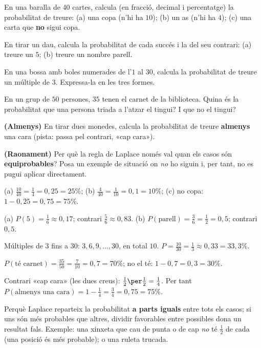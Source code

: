 \begin{exercicis}
\begin{exlist}
  \item En una baralla de $40$ cartes, calcula (en fracció, decimal i percentatge) la
        probabilitat de treure: (a) una copa (n'hi ha $10$); (b) un as (n'hi ha $4$);
        (c) una carta que \textbf{no} sigui copa.
  \item En tirar un dau, calcula la probabilitat de cada succés i la del seu contrari:
        (a) treure un $5$; (b) treure un nombre parell.
  \item En una bossa amb boles numerades de l'$1$ al $30$, calcula la probabilitat de
        treure un múltiple de $3$. Expressa-la en les tres formes.
  \item En un grup de $50$ persones, $35$ tenen el carnet de la biblioteca. Quina és la
        probabilitat que una persona triada a l'atzar el tingui? I que no el tingui?
  \item \textbf{(Almenys)} En tirar dues monedes, calcula la probabilitat de treure
        \textbf{almenys} una cara (pista: passa pel contrari, «cap cara»).
  \item \textbf{(Raonament)} Per què la regla de Laplace només val quan els casos són
        \textbf{equiprobables}? Posa un exemple de situació on \emph{no} ho siguin i, per
        tant, no es pugui aplicar directament.
\end{exlist}
\end{exercicis}

\begin{solucions}
\begin{sollist}
  \item (a) $\frac{10}{40}=\frac{1}{4}=0,25=25\%$; (b) $\frac{4}{40}=\frac{1}{10}=0,1=10\%$;
        (c) no copa: $1-0,25=0,75=75\%$.
  \item (a) $P(5)=\frac{1}{6}\approx 0,17$; contrari $\frac{5}{6}\approx 0,83$. \quad
        (b) $P(\text{parell})=\frac{3}{6}=\frac{1}{2}=0,5$; contrari $0,5$.
  \item Múltiples de $3$ fins a $30$: $3,6,9,\dots,30$, en total $10$.
        $P=\frac{10}{30}=\frac{1}{3}\approx 0,33=33,3\%$.
  \item $P(\text{té carnet})=\frac{35}{50}=\frac{7}{10}=0,7=70\%$; no el té:
        $1-0,7=0,3=30\%$.
  \item Contrari «cap cara» (les dues creus): $\frac{1}{2}\per\frac{1}{2}=\frac{1}{4}$.
        Per tant $P(\text{almenys una cara})=1-\frac{1}{4}=\frac{3}{4}=0,75=75\%$.
  \item Perquè Laplace reparteix la probabilitat \textbf{a parts iguals} entre tots els
        casos; si uns són més probables que altres, dividir favorables entre possibles
        dona un resultat fals. Exemple: una xinxeta que cau de punta o de cap \emph{no}
        té $\frac{1}{2}$ de cada (una posició és més probable); o una ruleta trucada.
\end{sollist}
\end{solucions}
